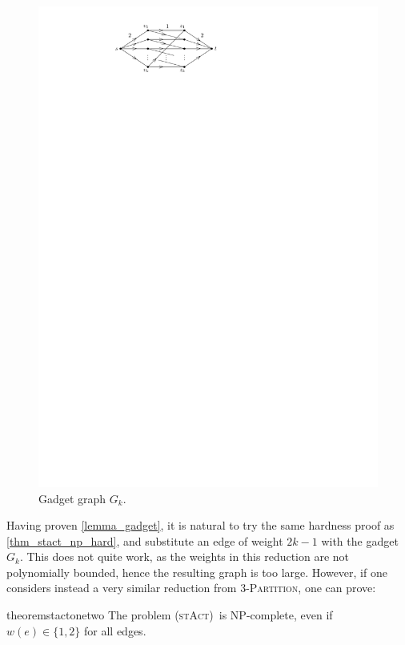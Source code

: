 \documentclass[runningheads]{llncs}
\numberwithin{equation}{section}
\newcommand{\set}[1]{\{ #1 \}}
\newcommand{\stact}{\textsc{(stAct)}}
\begin{document}
\begin{figure}[htpb]
\centering
\includegraphics[scale=1]{img/gadget-new}
\caption{Gadget graph $G_k$.}
\label{fig_gadget}
\end{figure}

Having proven \cref{lemma_gadget}, it is natural to try the same hardness proof as \cref{thm_stact_np_hard}, and substitute an edge of weight $2k-1$ with the gadget $G_k$. This does not quite work, as the weights in this reduction are not polynomially bounded, hence the resulting graph is too large. However, if one considers instead a very similar reduction from \textsc{3-Partition}, one can prove:

\begin{restatable}{theorem}{stactonetwo}
\label{thm:stact_weights_one_two}
The problem \stact\ is NP-complete, even if $w(e) \in \set{1, 2}$ for all edges.
\end{restatable}
\end{document}
